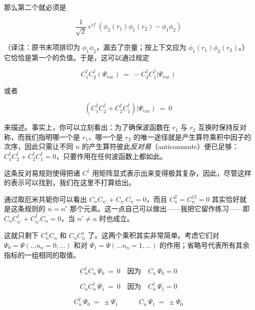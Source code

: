 那么第二个就必须是

\begin{equation*}
\frac{1}{\sqrt{2}}\ e^{if}\ \left(\phi_2(r_1)\phi_1(r_2)-\phi_1\phi_2\right)
\end{equation*}

（译注：原书末项排印为 $\phi_1\phi_2$，漏去了宗量；按上下文应为 $\phi_1(r_1)\phi_2(r_2)$。）它恰恰是第一个的负值。于是，这可以通过规定

\begin{equation*}
C_1^{\dagger} C_2^{\dagger}(\Psi_{\mathrm{vac}})\ =\ -C_2^{\dagger} C_1^{\dagger}\left|\Psi_{\mathrm{vac}}\right)
\end{equation*}

或者

\begin{equation*}
\left(C_1^{\dagger} C_2^{\dagger}+C_2^{\dagger} C_1^{\dagger}\right)\left|\Psi_{\mathrm{vac}}\right)\ =\ 0
\end{equation*}

来描述。事实上，你可以立刻看出：为了确保波函数在 $r_1$ 与 $r_2$ 互换时保持反对称，而我们指明哪一个是 $r_1$、哪一个是 $r_2$ 的唯一途径就是产生算符乘积中因子的次序，因此只需让不同 $n$ 的产生算符彼此\emph{反对易}（anticommute）便已足够：$C_1^{\dagger}C_2^{\dagger}+C_2^{\dagger}C_1^{\dagger}=0$，只要作用在任何波函数上都如此。

这条反对易规则使得把诸 $C^{\dagger}$ 用矩阵显式表示出来变得极其复杂，因此，尽管这样的表示可以找到，我们在这里不打算给出。

通过取厄米共轭你可以看出 $C_n C_{n'}+C_{n'}C_n=0$，而且 $C_n^2=C_n^{\dagger 2}=0$ 其实恰好就是这条规则的 $n=n'$ 那个元素。这一点自己可以做出——我把它留作练习——即 $C_n C_{n'}^{\dagger}+C_{n'}^{\dagger}C_n=0$，当 $n'\neq n$ 时也成立。

这就只剩下 $C_n^{\dagger}C_n$ 和 $C_nC_n^{\dagger}$ 了。这两个乘积其实非常简单。考虑它们对 $\Psi_0=\Psi(\ldots n_n=0,\ldots)$ 和对 $\Psi_1=\Psi(\ldots n_n=1,\ldots)$ 的作用；省略号代表所有其余指标的一组相同的取值。

\begin{equation*}
C_n^{\dagger} C_n\,\Psi_0\ =\ 0\quad\text{因为}\quad C_n\,\Psi_0=0
\end{equation*}

\begin{equation*}
C_n C_n^{\dagger}\,\Psi_1\ =\ 0\quad\text{因为}\quad C_n^{\dagger}\,\Psi_1=0
\end{equation*}

\begin{equation*}
C_n^{\dagger}\,\Psi_0\ =\ \pm\Psi_1\qquad\quad C_n\,\Psi_1\ =\ \pm\Psi_0
\end{equation*}

